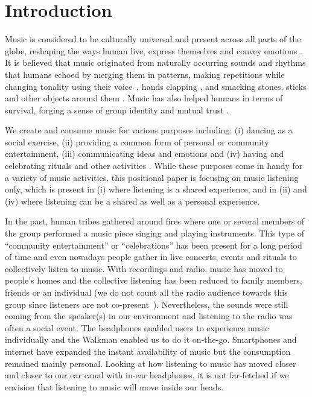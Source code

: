 \documentclass[sigchi]{acmart}
\begin{document}

\section{Introduction}

Music is considered to be culturally universal \cite{campbell1997music, seeger1971reflections} and present across all parts of the globe, reshaping the ways human live, express themselves and convey emotions \cite{juslin2001music,montagu2017music}. It is believed that music originated from naturally occurring sounds and rhythms that humans echoed by merging them in patterns, making repetitions while changing tonality using their voice~\cite{montagu2017music, morley2013prehistory}, hands clapping \cite{kassler1987dancing}, and smacking stones, sticks and other objects around them \cite{montagu2014horns}. Music has also helped humans in terms of survival, forging a sense of group identity and mutual trust \cite{conard2009new}. 

We create and consume music for various purposes including: (i) dancing as a social exercise, (ii) providing a common form of personal or community entertainment, (iii) communicating ideas and emotions and (iv) having and celebrating rituals and other activities \cite{montagu2017music}. While these purposes come in handy for a variety of music activities, this positional paper is focusing on music listening only, which is present in (i) where listening is a shared experience, and in (ii) and (iv) where listening can be a shared as well as a personal experience. 

In the past, human tribes gathered around fires where one or several members of the group performed a music piece singing and playing instruments. This type of ``community entertainment'' or ``celebrations'' has been present for a long period of time and even nowadays people gather in live concerts, events and rituals to collectively listen to music. With recordings and radio, music has moved to people's homes and the collective listening has been reduced to family members, friends or an individual (we do not count all the radio audience towards this group since listeners are not co-present~\cite{bonini2014new}). Nevertheless, the sounds were still coming from the speaker(s) in our environment and listening to the radio was often a social event. The headphones enabled users to experience music individually and the Walkman enabled us to do it on-the-go. Smartphones and internet have expanded the instant availability of music but the consumption remained mainly personal. Looking at how listening to music has moved closer and closer to our ear canal with in-ear headphones, it is not far-fetched if we envision that listening to music will move inside our heads.
\end{document}
